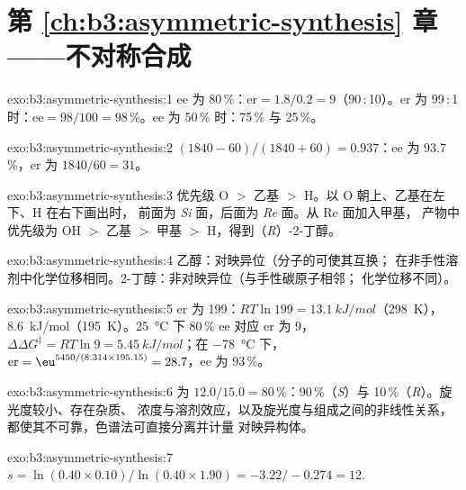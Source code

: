 \section*{第 \ref{ch:b3:asymmetric-synthesis} 章——不对称合成}

\begin{solution}{exo:b3:asymmetric-synthesis:1}
ee 为 80\,\%：$\mathrm{er} = 1.8/0.2 = 9$（90\,:\,10）。er 为 99\,:\,1 时：$\mathrm{ee} = 98/100 = 98$\,\%。ee 为 50\,\% 时：75\,\% 与 25\,\%。
\end{solution}

\begin{solution}{exo:b3:asymmetric-synthesis:2}
$(1840 - 60)/(1840 + 60) = 0.937$：ee 为 93.7\,\%，er 为 $1840/60 = 31$。
\end{solution}

\begin{solution}{exo:b3:asymmetric-synthesis:3}
优先级 O $>$ 乙基 $>$ H。以 O 朝上、乙基在左下、H 在右下画出时，
前面为 \textit{Si} 面，后面为 \textit{Re} 面。从 Re 面加入甲基，
产物中优先级为 OH $>$ 乙基 $>$ 甲基 $>$ H，得到（\textit{R}）-2-丁醇。
\end{solution}

\begin{solution}{exo:b3:asymmetric-synthesis:4}
乙醇：对映异位（分子的可使其互换；
在非手性溶剂中化学位移相同。2-丁醇：非对映异位（与手性碳原子相邻；
化学位移不同）。
\end{solution}

\begin{solution}{exo:b3:asymmetric-synthesis:5}
er 为 199：$RT\ln 199 = \qty{13.1}{kJ/mol}$（\qty{298}{K}），\qty{8.6}{kJ/mol}（\qty{195}{K}）。\qty{25}{\celsius} 下 80\,\% ee 对应 er 为 9，
$\Delta\Delta G^\ddagger = RT\ln 9 = \qty{5.45}{kJ/mol}$；在 \qty{-78}{\celsius} 下，$\mathrm{er} = \eu^{5450/(8.314 \times 195.15)} = 28.7$，ee 为 93\,\%。
\end{solution}

\begin{solution}{exo:b3:asymmetric-synthesis:6}
为 $12.0/15.0 = 80$\,\%：90\,\%（\textit{S}）与 10\,\%（\textit{R}）。旋光度较小、存在杂质、
浓度与溶剂效应，以及旋光度与组成之间的非线性关系，
都使其不可靠，色谱法可直接分离并计量
对映异构体。
\end{solution}

\begin{solution}{exo:b3:asymmetric-synthesis:7}
$s = \ln(0.40 \times 0.10)/\ln(0.40 \times 1.90) = -3.22/-0.274 = 12$.
\end{solution}

